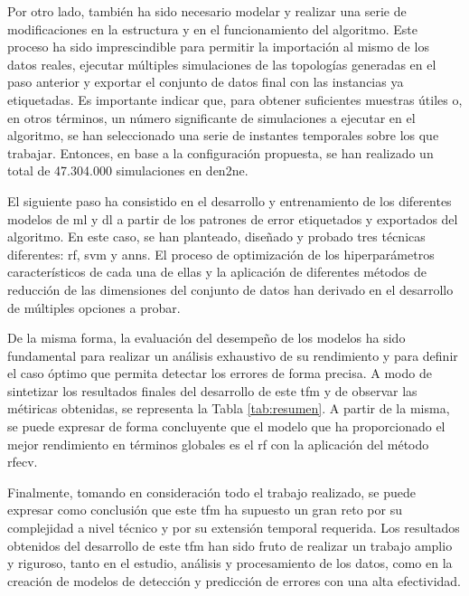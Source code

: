 \pagebreak

Por otro lado, también ha sido necesario modelar y realizar una serie de modificaciones en la estructura y en el funcionamiento del algoritmo. Este proceso ha sido imprescindible para permitir la importación al mismo de los datos reales, ejecutar múltiples simulaciones de las topologías generadas en el paso anterior y exportar el conjunto de datos final con las instancias ya etiquetadas. Es importante indicar que, para obtener suficientes muestras útiles o, en otros términos, un número significante de simulaciones a ejecutar en el algoritmo, se han seleccionado una serie de instantes temporales sobre los que trabajar. Entonces, en base a la configuración propuesta, se han realizado un total de 47.304.000 simulaciones en \gls{den2ne}.

\vspace{3mm}

El siguiente paso ha consistido en el desarrollo y entrenamiento de los diferentes modelos de \gls{ml} y \gls{dl} a partir de los patrones de error etiquetados y exportados del algoritmo. En este caso, se han planteado, diseñado y probado tres técnicas diferentes: \gls{rf}, \gls{svm} y \gls{ann}s. El proceso de optimización de los hiperparámetros característicos de cada una de ellas y la aplicación de diferentes métodos de reducción de las dimensiones del conjunto de datos han derivado en el desarrollo de múltiples opciones a probar. 

\vspace{3mm}

De la misma forma, la evaluación del desempeño de los modelos ha sido fundamental para realizar un análisis exhaustivo de su rendimiento y para definir el caso óptimo que permita detectar los errores de forma precisa. A modo de sintetizar los resultados finales del desarrollo de este \gls{tfm} y de observar las métiricas obtenidas, se representa la Tabla \ref{tab:resumen}. A partir de la misma, se puede expresar de forma concluyente que el modelo que ha proporcionado el mejor rendimiento en términos globales es el \gls{rf} con la aplicación del método \gls{rfecv}.

\vspace{3mm}

Finalmente, tomando en consideración todo el trabajo realizado, se puede expresar como conclusión que este \gls{tfm} ha supuesto un gran reto por su complejidad a nivel técnico y por su extensión temporal requerida. Los resultados obtenidos del desarrollo de este \gls{tfm} han sido fruto de realizar un trabajo amplio y riguroso, tanto en el estudio, análisis y procesamiento de los datos, como en la creación de modelos de detección y predicción de errores con una alta efectividad. 

